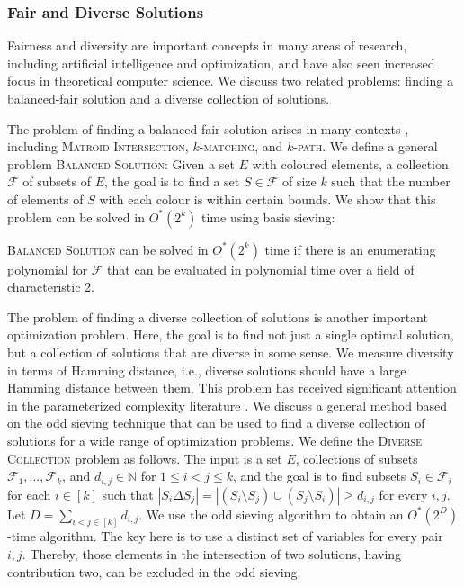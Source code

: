 \documentclass{theoretics}
\newcommand{\N}{\ensuremath{\mathbb N}\xspace}
\newcommand{\cF}{\ensuremath{\mathcal F}\xspace}
\begin{document}
\subsubsection{Fair and Diverse Solutions}

Fairness and diversity are important concepts in many areas of research, including artificial intelligence and optimization,
and have also seen increased focus in theoretical computer science.
We discuss two related problems: finding a balanced-fair solution and a diverse collection of solutions.

The problem of finding a balanced-fair solution arises in many contexts \cite{BandyapadhyayFIS23,BentertKN23,Chierichetti0LV17,Chierichetti0LV19}, including \textsc{Matroid Intersection}, \textsc{$k$-matching}, and \textsc{$k$-path}.
We define a general problem \textsc{Balanced Solution}:
Given a set $E$ with coloured elements, a collection $\mathcal{F}$ of subsets of $E$, the goal is to find a set $S \in \mathcal{F}$ of size $k$ such that the number of elements of $S$ with each colour is within certain bounds.
We show that this problem can be solved in $O^*(2^k)$ time using basis sieving:

\begin{theorem}
  \textsc{Balanced Solution} can be solved in $O^*(2^k)$ time if there is an enumerating polynomial for $\cF$ that can be evaluated in polynomial time over a field of characteristic 2.
\end{theorem}

The problem of finding a diverse collection of solutions is another important optimization problem.
Here, the goal is to find not just a single optimal solution, but a collection of solutions that are diverse in some sense.
We measure diversity in terms of Hamming distance, i.e., diverse solutions should have a large Hamming distance between them.
This problem has received significant attention in the parameterized complexity literature \cite{BasteFJMOPR22,BasteJMPR19,FominGJPS24,FominGPPS24,HanakaKKO21}.
We discuss a general method based on the odd sieving technique that can be used to find a diverse collection of solutions for a wide range of optimization problems.
We define the \textsc{Diverse Collection} problem as follows.
The input is a set $E$, collections of subsets $\cF_1, \dots, \cF_k$, and $d_{i,j} \in \N$ for $1 \leq i < j \leq k$, and the goal is to find subsets $S_i \in \cF_i$ for each $i \in [k]$ such that $|S_i \Delta S_j| = |(S_i \setminus S_j) \cup (S_j \setminus S_i)| \ge d_{i,j}$ for every $i, j$.
Let $D =  \sum_{i < j \in [k]} d_{i,j}$.
We use the odd sieving algorithm to obtain an $O^*(2^D)$-time algorithm.
The key here is to use a distinct set of variables for every pair $i,j$. 
Thereby, those elements in the intersection of two solutions, having contribution two, can be excluded in the odd sieving.
\end{document}
